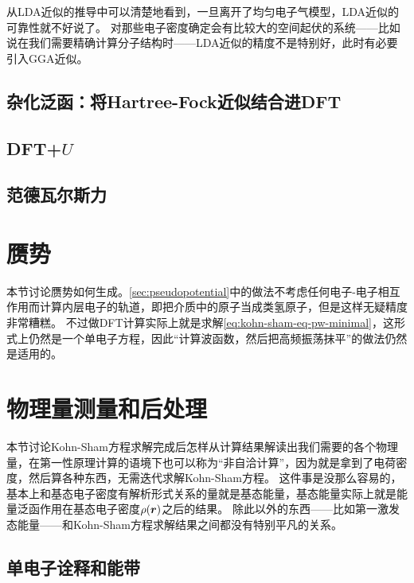 从LDA近似的推导中可以清楚地看到，一旦离开了均匀电子气模型，LDA近似的可靠性就不好说了。
对那些电子密度确定会有比较大的空间起伏的系统——比如说在我们需要精确计算分子结构时——LDA近似的精度不是特别好，此时有必要引入GGA近似。

\subsection{杂化泛函：将Hartree-Fock近似结合进DFT}

\subsection{DFT+$U$}

\subsection{范德瓦尔斯力}

\section{赝势}\label{sec:dft-pseudo-pot}

本节讨论赝势如何生成。\autoref{sec:pseudopotential}中的做法不考虑任何电子-电子相互作用而计算内层电子的轨道，即把介质中的原子当成类氢原子，但是这样无疑精度非常糟糕。
不过做DFT计算实际上就是求解\eqref{eq:kohn-sham-eq-pw-minimal}，这形式上仍然是一个单电子方程，因此“计算波函数，然后把高频振荡抹平”的做法仍然是适用的。

\section{物理量测量和后处理}

本节讨论Kohn-Sham方程求解完成后怎样从计算结果解读出我们需要的各个物理量，在第一性原理计算的语境下也可以称为“非自洽计算”，因为就是拿到了电荷密度，然后算各种东西，无需迭代求解Kohn-Sham方程。
这件事是没那么容易的，基本上和基态电子密度有解析形式关系的量就是基态能量，基态能量实际上就是能量泛函作用在基态电子密度$\rho(\vb*{r})$之后的结果。
除此以外的东西——比如第一激发态能量——和Kohn-Sham方程求解结果之间都没有特别平凡的关系。


\subsection{单电子诠释和能带}\label{sec:single-electron-in-dft}

